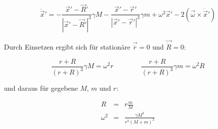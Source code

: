 \documentclass[12pt]{article}
\begin{document}
\begin{equation}
\ddot{\vec{x}}' =
- \frac{\vec{x}'-\vec{R}'}{\left| \vec{x}' - \vec{R}' \right|^3} \gamma M
- \frac{\vec{x}'-\vec{r}'}{\left| \vec{x}' - \vec{r}' \right|^3} \gamma m 
+ \omega^2\vec{x}' 
- 2 \left( \vec{\omega} \times \dot{\vec{x}}'\right)
\label{eq:twoBodies}
\end{equation}

Durch Einsetzen ergibt sich für stationäre $\vec{\ddot{r}}=0$ und $\vec{\ddot{R}}=0$:

\begin{equation}
\frac{r+R}{\left(r+R\right)^3} \gamma M = \omega^2 r \qquad \qquad
\frac{r+R}{\left(r+R\right)^3} \gamma m = \omega^2 R \nonumber
\end{equation}

\noindent und daraus für gegebene $M$, $m$ und $r$:

\begin{eqnarray}
R        &=& r \frac{m}{M} \nonumber \\
\omega^2 &=& \frac{\gamma M^3}{r^3 \left(M+m\right)^2} \nonumber
\end{eqnarray}
\end{document}
